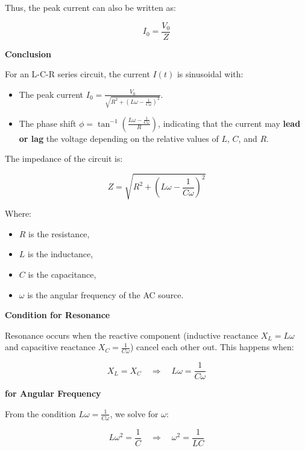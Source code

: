 \documentclass{beamer}
\begin{document}
\begin{frame}

Thus, the peak current can also be written as:

\[
I_0 = \frac{V_0}{Z}
\]

\textbf{Conclusion}

For an L-C-R series circuit, the current \( I(t) \) is sinusoidal with:

\begin{itemize}
    \item The peak current \( I_0 = \frac{V_0}{\sqrt{R^2 + \left( L \omega - \frac{1}{C \omega} \right)^2}} \).
    \item The phase shift \( \phi = \tan^{-1}\left( \frac{L \omega - \frac{1}{C \omega}}{R} \right) \), indicating that the current may \textbf{lead or lag} the voltage depending on the relative values of \( L \), \( C \), and \( R \).
\end{itemize}

The impedance of the circuit is:

\[
Z = \sqrt{R^2 + \left( L \omega - \frac{1}{C \omega} \right)^2}
\]

\end{frame}


\begin{frame}



Where:
\begin{itemize}
    \item \( R \) is the resistance,
    \item \( L \) is the inductance,
    \item \( C \) is the capacitance,
    \item \( \omega \) is the angular frequency of the AC source.
\end{itemize}

\textbf{Condition for Resonance}

Resonance occurs when the reactive component (inductive reactance \( X_L = L \omega \) and capacitive reactance \( X_C = \frac{1}{C \omega} \)) cancel each other out. This happens when:

\[
X_L = X_C \quad \Rightarrow \quad L \omega = \frac{1}{C \omega}
\]

\textbf{for Angular Frequency}

From the condition \( L \omega = \frac{1}{C \omega} \), we solve for \( \omega \):

\[
L \omega^2 = \frac{1}{C} \quad \Rightarrow \quad \omega^2 = \frac{1}{LC}
\]
\end{frame}
\end{document}
